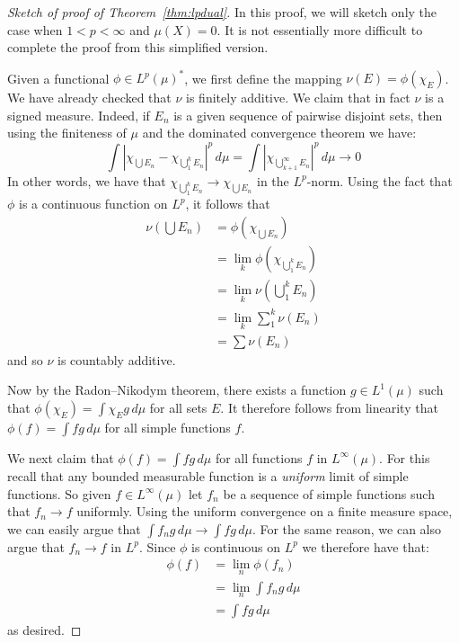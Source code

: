 \documentclass[11pt,oneside]{amsbook}
\theoremstyle{definition}
\theoremstyle{plain}
\theoremstyle{definition}
\theoremstyle{remark}
\numberwithin{equation}{section}
\numberwithin{figure}{section}
\begin{document}
\begin{proof}[Sketch of proof of Theorem~\ref{thm:lpdual}]
  In this proof, we will sketch only the case when $1<p<\infty$ and $\mu(X)=0$. It is not essentially more difficult to complete the proof from this simplified version.

  Given a functional $\phi\in L^p(\mu)^*$, we first define the mapping $\nu(E)=\phi(\chi_E)$. We have already checked that $\nu$ is finitely additive. We claim that in fact $\nu$ is a signed measure. Indeed, if $E_n$ is a given sequence of pairwise disjoint sets, then using the finiteness of $\mu$ and the dominated convergence theorem we have:
  \[\int|\chi_{\bigcup E_n}-\chi_{\bigcup_1^kE_n}|^p\,d\mu
    =\int|\chi_{\bigcup_{k+1}^\infty E_n}|^p\,d\mu
    \to0
  \]
  In other words, we have that $\chi_{\bigcup_1^kE_n}\to\chi_{\bigcup E_n}$ in the $L^p$-norm. Using the fact that $\phi$ is a continuous function on $L^p$, it follows that
  \begin{align*}
    \nu(\bigcup E_n)&=\phi(\chi_{\bigcup E_n})\\
                    &=\lim_k\phi(\chi_{\bigcup_1^kE_n})\\
                    &=\lim_k\nu(\bigcup_1^kE_n)\\
                    &=\lim_k\sum_1^k\nu(E_n)\\
                    &=\sum\nu(E_n)
  \end{align*}
  and so $\nu$ is countably additive.

  Now by the Radon--Nikodym theorem, there exists a function $g\in L^1(\mu)$ such that $\phi(\chi_E)=\int\chi_Eg\,d\mu$ for all sets $E$. It therefore follows from linearity that $\phi(f)=\int fg\,d\mu$ for all simple functions $f$.

  We next claim that $\phi(f)=\int fg\,d\mu$ for all functions $f$ in $L^\infty(\mu)$. For this recall that any bounded measurable function is a \emph{uniform} limit of simple functions. So given $f\in L^\infty(\mu)$ let $f_n$ be a sequence of simple functions such that $f_n\to f$ uniformly. Using the uniform convergence on a finite measure space, we can easily argue that $\int f_ng\,d\mu\to\int fg\,d\mu$. For the same reason, we can also argue that $f_n\to f$ in $L^p$. Since $\phi$ is continuous on $L^p$ we therefore have that:
  \begin{align*}
    \phi(f)&=\lim_n\phi(f_n)\\
           &=\lim_n\int f_ng\,d\mu\\
           &=\int fg\,d\mu
  \end{align*}
  as desired.


\end{proof}
\end{document}
